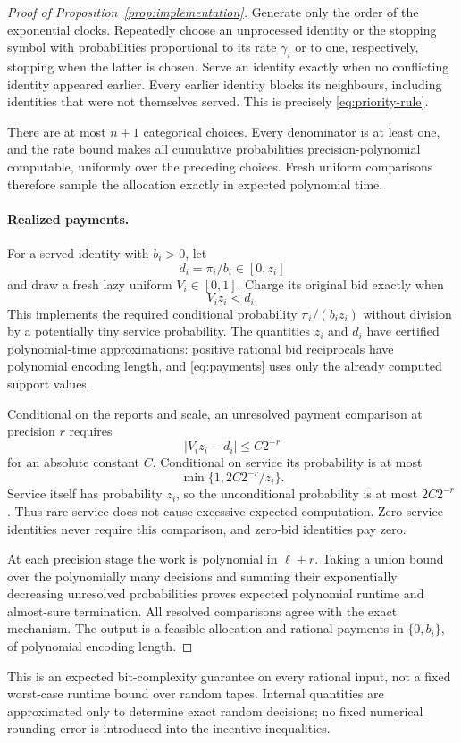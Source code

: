 \documentclass[11pt]{article}
\begin{document}
\begin{proof}[Proof of Proposition~\ref{prop:implementation}]
Generate only the order of the exponential clocks.
Repeatedly choose an unprocessed identity or the stopping
symbol with probabilities proportional to its rate $\gamma_i$
or to one, respectively, stopping when the latter is chosen.
Serve an identity exactly when no conflicting identity
appeared earlier.
Every earlier identity blocks its neighbours, including
identities that were not themselves served.
This is precisely \eqref{eq:priority-rule}.

There are at most $n+1$ categorical choices.
Every denominator is at least one, and the rate bound makes
all cumulative probabilities precision-polynomial computable,
uniformly over the preceding choices.
Fresh uniform comparisons therefore sample the allocation
exactly in expected polynomial time.

\paragraph{Realized payments.}
For a served identity with $b_i>0$, let
\[
d_i=\pi_i/b_i\in[0,z_i]
\]
and draw a fresh lazy uniform $V_i\in[0,1]$.
Charge its original bid exactly when
\[
V_i z_i<d_i.
\]
This implements the required conditional probability
$\pi_i/(b_i z_i)$ without division by a potentially tiny
service probability.
The quantities $z_i$ and $d_i$ have certified polynomial-time
approximations: positive rational bid reciprocals have
polynomial encoding length, and \eqref{eq:payments} uses
only the already computed support values.

Conditional on the reports and scale, an unresolved payment
comparison at precision $r$ requires
\[
|V_i z_i-d_i|\le C2^{-r}
\]
for an absolute constant $C$.
Conditional on service its probability is at most
\[
\min\{1,2C2^{-r}/z_i\}.
\]
Service itself has probability $z_i$, so the unconditional
probability is at most $2C2^{-r}$.
Thus rare service does not cause excessive expected
computation.
Zero-service identities never require this comparison,
and zero-bid identities pay zero.

At each precision stage the work is polynomial in $\ell+r$.
Taking a union bound over the polynomially many decisions
and summing their exponentially decreasing unresolved
probabilities proves expected polynomial runtime and
almost-sure termination.
All resolved comparisons agree with the exact mechanism.
The output is a feasible allocation and rational payments
in $\{0,b_i\}$, of polynomial encoding length.
\end{proof}

This is an expected bit-complexity guarantee on every rational
input, not a fixed worst-case runtime bound over random tapes.
Internal quantities are approximated only to determine exact
random decisions; no fixed numerical rounding error is
introduced into the incentive inequalities.




\end{document}
